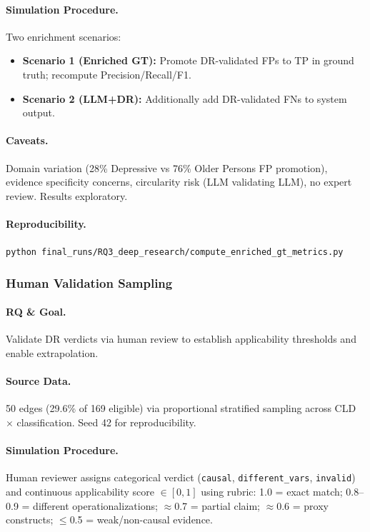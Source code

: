 \paragraph{Simulation Procedure.}
Two enrichment scenarios:
\begin{itemize}[noitemsep]
    \item \textbf{Scenario 1 (Enriched GT):} Promote DR-validated FPs to TP in ground truth; recompute Precision/Recall/F1.
    \item \textbf{Scenario 2 (LLM+DR):} Additionally add DR-validated FNs to system output.
\end{itemize}

\paragraph{Caveats.}
Domain variation (28\% Depressive vs 76\% Older Persons FP promotion), evidence specificity concerns, circularity risk (LLM validating LLM), no expert review. Results exploratory.

\paragraph{Reproducibility.}
\texttt{python final\_runs/RQ3\_deep\_research/compute\_enriched\_gt\_metrics.py}

\subsubsection{Human Validation Sampling}
\label{sec:rq3_human_validation}

\paragraph{RQ \& Goal.}
Validate DR verdicts via human review to establish applicability thresholds and enable extrapolation.

\paragraph{Source Data.}
50 edges (29.6\% of 169 eligible) via proportional stratified sampling across CLD $\times$ classification. Seed 42 for reproducibility.

\paragraph{Simulation Procedure.}
Human reviewer assigns categorical verdict (\texttt{causal}, \texttt{different\_vars}, \texttt{invalid}) and continuous applicability score $\in[0,1]$ using rubric: 1.0 = exact match; 0.8--0.9 = different operationalizations; $\approx$0.7 = partial claim; $\approx$0.6 = proxy constructs; $\leq$0.5 = weak/non-causal evidence.

